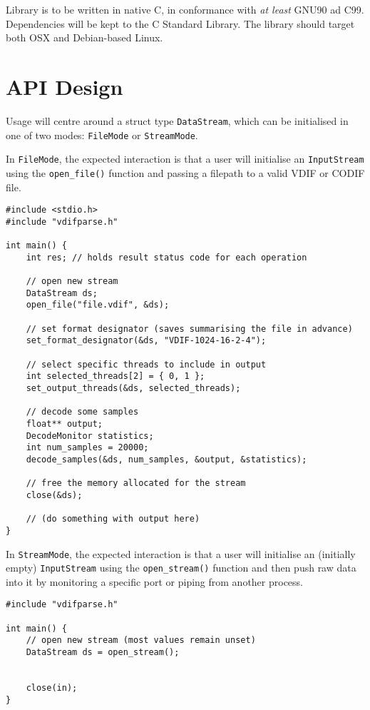 \documentclass[11pt]{article}
\begin{document}
Library is to be written in native C, in conformance with \textit{at least} GNU90 ad C99. Dependencies will be kept to the C Standard Library. The library should target both OSX and Debian-based Linux.

\section{API Design}

Usage will centre around a struct type \lstinline{DataStream}, which can be initialised in one of two modes: \lstinline{FileMode} or \lstinline{StreamMode}.

In \lstinline{FileMode}, the expected interaction is that a user will initialise an \lstinline{InputStream} using the \lstinline{open_file()} function and passing a filepath to a valid VDIF or CODIF file.

\begin{lstlisting}
#include <stdio.h>
#include "vdifparse.h"

int main() { 
	int res; // holds result status code for each operation
	
	// open new stream
	DataStream ds;
	open_file("file.vdif", &ds);
	
	// set format designator (saves summarising the file in advance)
	set_format_designator(&ds, "VDIF-1024-16-2-4");
	
	// select specific threads to include in output
	int selected_threads[2] = { 0, 1 };
	set_output_threads(&ds, selected_threads);
	
	// decode some samples
	float** output;
	DecodeMonitor statistics;
	int num_samples = 20000;
	decode_samples(&ds, num_samples, &output, &statistics);
	
	// free the memory allocated for the stream
	close(&ds);
	
	// (do something with output here)
} 
\end{lstlisting} 

In \lstinline{StreamMode}, the expected interaction is that a user will initialise an (initially empty) \lstinline{InputStream} using the \lstinline{open_stream()} function and then push raw data into it by monitoring a specific port or piping from another process.

\begin{lstlisting} 
#include "vdifparse.h"

int main() { 
	// open new stream (most values remain unset)
	DataStream ds = open_stream();
	
	
	close(in);
} 
\end{lstlisting} 
\end{document}
